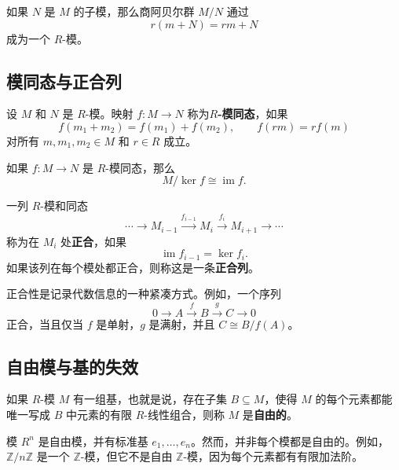 \begin{definition}[商模]
如果 $N$ 是 $M$ 的子模，那么商阿贝尔群 $M/N$ 通过
\[
    r(m+N)=rm+N
\]
成为一个 $R$-模。
\end{definition}

\subsection{模同态与正合列}

\begin{definition}[模同态]
设 $M$ 和 $N$ 是 $R$-模。映射 $f:M\to N$ 称为\textbf{$R$-模同态}，如果
\[
    f(m_1+m_2)=f(m_1)+f(m_2),
    \qquad
    f(rm)=rf(m)
\]
对所有 $m,m_1,m_2\in M$ 和 $r\in R$ 成立。
\end{definition}

\begin{theorem}[模第一同构定理]
如果 $f:M\to N$ 是 $R$-模同态，那么
\[
    M/\ker f\cong \operatorname{im}f.
\]
\end{theorem}

\begin{definition}[正合列]
一列 $R$-模和同态
\[
    \cdots\to M_{i-1}\xrightarrow{f_{i-1}}M_i\xrightarrow{f_i}M_{i+1}\to\cdots
\]
称为在 $M_i$ 处\textbf{正合}，如果
\[
    \operatorname{im}f_{i-1}=\ker f_i.
\]
如果该列在每个模处都正合，则称这是一条\textbf{正合列}。
\end{definition}

\begin{remark}
正合性是记录代数信息的一种紧凑方式。例如，一个序列
\[
    0\to A\xrightarrow{f}B\xrightarrow{g}C\to 0
\]
正合，当且仅当 $f$ 是单射，$g$ 是满射，并且 $C\cong B/f(A)$。
\end{remark}

\subsection{自由模与基的失效}

\begin{definition}[自由模]
如果 $R$-模 $M$ 有一组基，也就是说，存在子集 $B\subseteq M$，使得 $M$ 的每个元素都能唯一写成 $B$ 中元素的有限 $R$-线性组合，则称 $M$ 是\textbf{自由的}。
\end{definition}

\begin{example}
模 $R^n$ 是自由模，并有标准基 $e_1,\dots,e_n$。然而，并非每个模都是自由的。例如，$\mathbb{Z}/n\mathbb{Z}$ 是一个 $\mathbb{Z}$-模，但它不是自由 $\mathbb{Z}$-模，因为每个元素都有有限加法阶。
\end{example}

